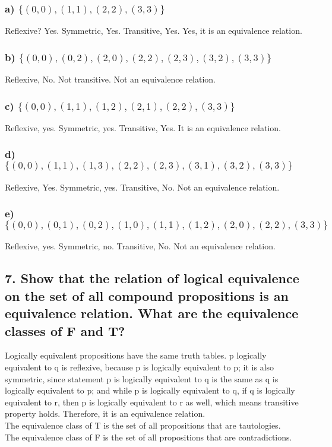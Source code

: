 \documentclass[11pt, oneside]{article} %
\numberwithin{equation}{section} %
\numberwithin{figure}{section} %
\numberwithin{table}{section} %
\begin{document}
\subsubsection{a) $\{(0,0),(1,1),(2,2),(3,3)\}$}
Reflexive? Yes. Symmetric, Yes. Transitive, Yes. Yes, it is an equivalence relation.
\subsubsection{b) $\{(0,0),(0,2),(2,0),(2,2),(2,3),(3,2),(3,3)\}$}
Reflexive, No. Not transitive. Not an equivalence relation.
\subsubsection{c) $\{(0,0),(1,1),(1,2),(2,1),(2,2),(3,3)\}$}
Reflexive, yes. Symmetric, yes. Transitive, Yes. It is an equivalence relation.
\subsubsection{d) $\{(0,0),(1,1),(1,3),(2,2),(2,3),(3,1),(3,2),(3, 3)\}$}
Reflexive, Yes. Symmetric, yes. Transitive, No. Not an equivalence relation.
\subsubsection{e) $\{(0, 0), (0, 1), (0, 2), (1, 0), (1, 1), (1, 2), (2, 0),
(2, 2), (3, 3)\}$}
Reflexive, yes. Symmetric, no. Transitive, No. Not an equivalence relation.




\subsection{7. Show that the relation of logical equivalence on the set of all compound propositions is an equivalence relation. What are the equivalence classes of F and T?}
Logically equivalent propositions have the same truth tables. p logically equivalent to q is reflexive, because p is logically equivalent to p; it is also symmetric, since statement p is logically equivalent to q is the same as q is logically equivalent to p; and while p is logically equivalent to q, if q is logically equivalent to r, then p is logically equivalent to r as well, which means transitive property holds. Therefore, it is an equivalence relation.\\
The equivalence class of T is the set of all propositions that are tautologies.   \\
The equivalence class of F is the set of all propositions that are contradictions. \\
\end{document}
